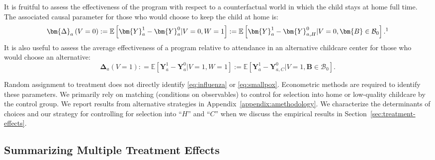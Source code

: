 It is fruitful to assess the effectiveness of the program with respect to a counterfactual world in which the child stays at home full time. The associated causal parameter for those who would choose to keep the child at home is:
\begin{equation}\label{eq:influenza}
\bm{\Delta}_a \left(V = 0 \right) : =   \mathbb{E} \left[ \bm{Y}^1_a - \bm{Y}^0_a | V = 0, W = 1 \right] := \mathbb{E} \left[\bm{Y}^1_{a} - \bm{Y}^0_{a,H} | V = 0, \bm{B} \in \mathcal{B}_0 \right].\footnote{Appendix~\ref{appendix:vsensitivity-controlsub} displays results with alternative definitions of $V$ (i.e., different thresholds define if a child attended alternative childcare). The results are robust to the various definitions. What matters is whether any out-of-home child care is being used ($V>0$), and not the specific value of $V$.}
\end{equation}
It is also useful to assess the average effectiveness of a program relative to attendance in an alternative childcare center for those who would choose an alternative:
\begin{equation}\label{eq:smallpox}
\bm{\Delta}_a \left( V =1 \right) : =   \mathbb{E} \left[ \bm{Y}^1_a - \bm{Y}^0_a | V = 1, W = 1 \right] := \mathbb{E} \left[\bm{Y}^1_a - \bm{Y}^0_{a,C} | V = 1, \bm{B} \in \mathcal{B}_0 \right].
\end{equation}

Random assignment to treatment does not directly identify \eqref{eq:influenza} or \eqref{eq:smallpox}. Econometric methods are required to identify these parameters. We primarily rely on matching (conditions on observables) to control for selection into home or low-quality childcare by the control group. We report results from alternative strategies in Appendix~\ref{appendix:amethodology}. We characterize the determinants of choices and our strategy for controlling for selection into ``$H$'' and ``$C$'' when we discuss the empirical results in Section~\ref{sec:treatment-effects}.

\subsection{Summarizing Multiple Treatment Effects}\label{sec:combining-functions}

